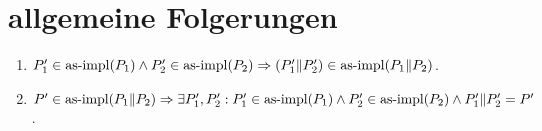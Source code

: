 \chapter{allgemeine Folgerungen}

\begin{Lem}\mbox{}
  \label{impParallelLem}
  \begin{enumerate}
    \item $P'_1\in\mathrm{as}\text{-}\mathrm{impl} (P_1) \land P'_2 \in\mathrm{as}\text{-}\mathrm{impl} (P_2) \Rightarrow
      (P'_1\|P'_2) \in\mathrm{as}\text{-}\mathrm{impl} (P_1\|P_2)$.
    \item $P' \in\mathrm{as}\text{-}\mathrm{impl} (P_1\|P_2) \Rightarrow \exists P'_1,P'_2 : P'_1
      \in\mathrm{as}\text{-}\mathrm{impl} (P_1) \land P'_2 \in\mathrm{as}\text{-}\mathrm{impl} (P_2) \land P'_1\|P'_2=P'$.
  \end{enumerate}
\end{Lem}

